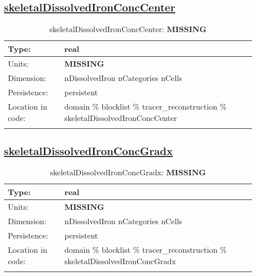 \subsection[skeletalDissolvedIronConcCenter]{\hyperref[sec:var_tab_tracer_reconstruction]{skeletalDissolvedIronConcCenter}}
\label{subsec:var_sec_tracer_reconstruction_skeletalDissolvedIronConcCenter}
\begin{center}
\begin{longtable}{| p{2.0in} | p{4.0in} |}
        \hline 
        Type: & real \\
        \hline 
        Units: & {\bf \color{red} MISSING} \\
        \hline 
        Dimension: & nDissolvedIron nCategories nCells \\
        \hline 
        Persistence: & persistent \\
        \hline 
         Location in code: & domain \% blocklist \% tracer\_reconstruction \% skeletalDissolvedIronConcCenter \\
         \hline 
    \caption{skeletalDissolvedIronConcCenter: {\bf \color{red} MISSING}}
\end{longtable}
\end{center}
\subsection[skeletalDissolvedIronConcGradx]{\hyperref[sec:var_tab_tracer_reconstruction]{skeletalDissolvedIronConcGradx}}
\label{subsec:var_sec_tracer_reconstruction_skeletalDissolvedIronConcGradx}
\begin{center}
\begin{longtable}{| p{2.0in} | p{4.0in} |}
        \hline 
        Type: & real \\
        \hline 
        Units: & {\bf \color{red} MISSING} \\
        \hline 
        Dimension: & nDissolvedIron nCategories nCells \\
        \hline 
        Persistence: & persistent \\
        \hline 
         Location in code: & domain \% blocklist \% tracer\_reconstruction \% skeletalDissolvedIronConcGradx \\
         \hline 
    \caption{skeletalDissolvedIronConcGradx: {\bf \color{red} MISSING}}
\end{longtable}
\end{center}
